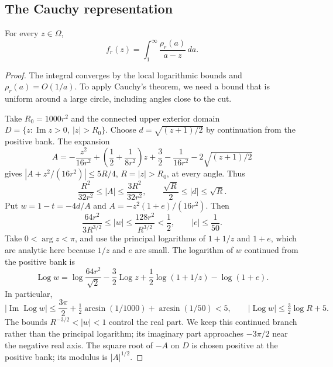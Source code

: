 \subsection{The Cauchy representation}
\begin{lemma}\label{lem:dispersion}
For every $z\in\Omega$,
\begin{equation}\label{eq:dispersion}
 f_r(z)=\int_1^\infty\frac{\rho_r(a)}{a-z}\,da .
\end{equation}
\end{lemma}
\begin{proof}
The integral converges by the local logarithmic bounds and
$\rho_r(a)=O(1/a)$. To apply Cauchy's theorem, we need a bound that is
uniform around a large circle, including angles close to the cut.

Take $R_0=1000r^2$ and the connected upper exterior domain
$D=\{z:\operatorname{Im}z>0,\ |z|>R_0\}$. Choose
$d=\sqrt{(z+1)/2}$ by continuation from the positive bank. The expansion
\[
 A=-\frac{z^2}{16r^2}
   +\left(\frac12+\frac1{8r^2}\right)z
   +\frac32-\frac1{16r^2}-2\sqrt{(z+1)/2}
\]
gives $|A+z^2/(16r^2)|\le5R/4$, $R=|z|>R_0$, at every angle. Thus
\[
 \frac{R^2}{32r^2}\le |A|\le\frac{3R^2}{32r^2},\qquad
 \frac{\sqrt R}{2}\le |d|\le\sqrt R .
\]
Put $w=1-t=-4d/A$ and $A=-z^2(1+e)/(16r^2)$. Then
\[
 \frac{64r^2}{3R^{3/2}}\le |w|
       \le\frac{128r^2}{R^{3/2}}<\frac12,\qquad |e|\le\frac1{50}.
\]
Take $0<\arg z<\pi$, and use the principal logarithms of $1+1/z$ and
$1+e$, which are analytic here because $1/z$ and $e$ are small. The logarithm of $w$ continued from the positive bank is
\begin{equation}\label{eq:continuedlog}
 \operatorname{Log}w=\log\frac{64r^2}{\sqrt2}
 -\frac32\operatorname{Log}z+\frac12\log(1+1/z)-\log(1+e).
\end{equation}
In particular,
\[
 |\operatorname{Im}\operatorname{Log}w|
 \le\frac{3\pi}{2}+\tfrac12\arcsin(1/1000)+\arcsin(1/50)<5,
 \qquad |\operatorname{Log}w|\le\tfrac32\log R+5.
\]
The bounds $R^{-3/2}<|w|<1$ control the real part. We keep this continued
branch rather than the principal logarithm; its imaginary part approaches
$-3\pi/2$ near the negative real axis.
The square root of $-A$ on $D$ is chosen positive at the positive bank;
its modulus is $|A|^{1/2}$.


\end{proof}
